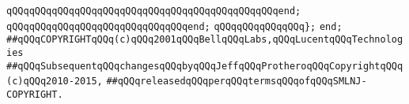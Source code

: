 \verb|qQQqqQQqqQQqqQQqqQQqqQQqqQQqqQQqqQQqqQQqqQQqqQQqend;|\newline
\verb|qQQqqQQqqQQqqQQqqQQqqQQqqQQqqQQqend;|\newline
\verb|qQQqqQQqqQQqqQQq};|\newline
\verb|end;|\newline
\newline
\verb|##qQQqCOPYRIGHTqQQq(c)qQQq2001qQQqBellqQQqLabs,qQQqLucentqQQqTechnologies|\newline
\verb|##qQQqSubsequentqQQqchangesqQQqbyqQQqJeffqQQqProtheroqQQqCopyrightqQQq(c)qQQq2010-2015,|\newline
\verb|##qQQqreleasedqQQqperqQQqtermsqQQqofqQQqSMLNJ-COPYRIGHT.|\newline

